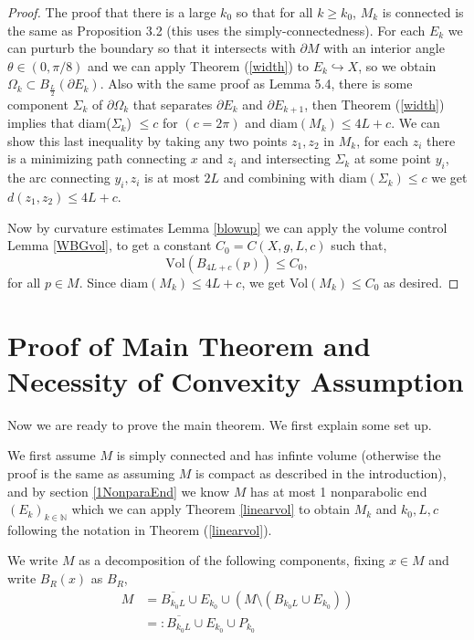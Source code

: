 \documentclass[12pt]{amsart}
\newcommand{\N}{\mathbb N}
\numberwithin{equation}{section}
\begin{document}
	\begin{proof}
		The proof that there is a large $k_0$ so that for all $k\geq k_0$, $M_k$ is connected is the same as \cite{ChodoLiStryk2022-CompleteStableMinimal} Proposition 3.2 (this uses the simply-connectedness). For each $E_k$ we can purturb the boundary so that it intersects with $\partial M$ with an interior angle $\theta \in (0,\pi/8)$ and we can apply Theorem (\ref{width}) to $E_k \hookrightarrow X$, so we obtain $\Omega_k \subset B_{\frac{L}{2}}(\partial E_k)$. Also with the same proof as \cite{ChodoLiStryk2022-CompleteStableMinimal} Lemma 5.4, there is some component $\Sigma_k$ of $\partial \Omega_k$ that separates $\partial E_k$ and $\partial E_{k+1}$, then Theorem (\ref{width}) implies that diam($\Sigma_k$) $\leq c $ for $(c=2\pi)$ and diam$(M_k)  \leq 4L+c.$ We can show this last inequality by taking any two points $z_1, z_2$ in $M_k$, for each $z_i$ there is a minimizing path connecting $x$ and $z_i$ and intersecting $\Sigma_k$ at some point $y_i$, the arc connecting $y_i,z_i$ is at most $2L$ and combining with diam$(\Sigma_k) \leq c$ we get $d(z_1,z_2) \leq 4L+c$.

		Now by curvature estimates Lemma \ref{blowup} we can apply the volume control Lemma \ref{WBGvol}, to get a constant $C_0=C(X,g, L, c)$ such that,
		\begin{equation*}
			\text{Vol}(B_{4L+c}(p)) \leq C_0,
		\end{equation*}
		for all $p \in M$. Since diam$(M_k)\leq 4L+c$, we get Vol$(M_k) \leq C_0$ as desired.
	\end{proof}

	\section{Proof of Main Theorem and Necessity of Convexity Assumption}

	Now we are ready to prove the main theorem. We first explain some set up. 
	
	We first assume $M$ is simply connected and has infinte volume (otherwise the proof is the same as assuming $M$ is compact as described in the introduction), and by section \ref{1NonparaEnd} we know $M$ has at most 1 nonparabolic end $(E_k)_{k \in \N}$ which we can apply Theorem \ref{linearvol} to obtain $M_k$ and $k_0, L,c$ following the notation in Theorem (\ref{linearvol}). 

	We write $M$ as a decomposition of the following components, fixing $x \in M$ and write $B_R(x)$ as $B_R$, 
	\begin{align*}
		M &=\overline{B_{k_0 L}} \cup E_{k_0} \cup (M\setminus (B_{k_0L} \cup E_{k_0}))\\
		&=:\overline{B_{k_0 L}} \cup E_{k_0} \cup P_{k_0}\\
	\end{align*}
\end{document}
